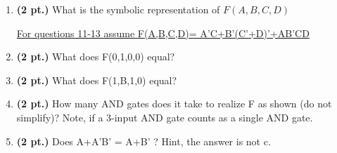 \documentclass{article}
\begin{document}
\begin{enumerate}
\item {\bf (2 pt.)} What is the symbolic representation of $F(A,B,C,D)$ 


\underline{For questions 11-13 assume F(A,B,C,D)= A'C+B'(C'+D)'+AB'CD}

\item {\bf (2 pt.)} What does F(0,1,0,0) equal?

\item {\bf (2 pt.)} What does F(1,B,1,0) equal?

\item {\bf (2 pt.)} How many AND gates does it take to realize F 
as shown (do not simplify)?  Note, if a 3-input AND gate counts
as a single AND gate.

\pagebreak
\item {\bf (2 pt.)} Does A+A'B' = A+B' ?
Hint, the answer is not c.


\end{enumerate}
\end{document}
